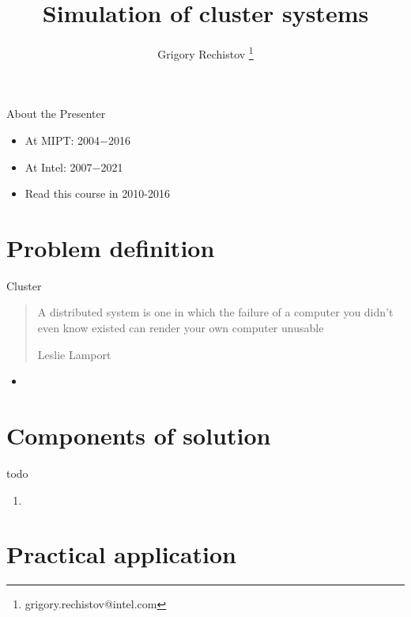 

\author{Grigory Rechistov \thanks{grigory.rechistov@intel.com}}
\title{Simulation of cluster systems}



\startslides

\begin{frame}{About the Presenter}
\begin{itemize}
\item At MIPT: 2004−2016
\item At Intel: 2007−2021
\item Read this course in 2010-2016
\end{itemize}
\end{frame}



\section{Problem definition}


\begin{frame}{Cluster}

\begin{quotation}
A distributed system is one in which the failure of a computer you didn't even know existed can render your own computer unusable

Leslie Lamport
\end{quotation}


\begin{itemize}
    \item 
\end{itemize}

\end{frame}

\section{Components of solution}

\begin{frame}{todo}


\begin{enumerate}
    \item 
\end{enumerate}

\end{frame}

\section{Practical application}

